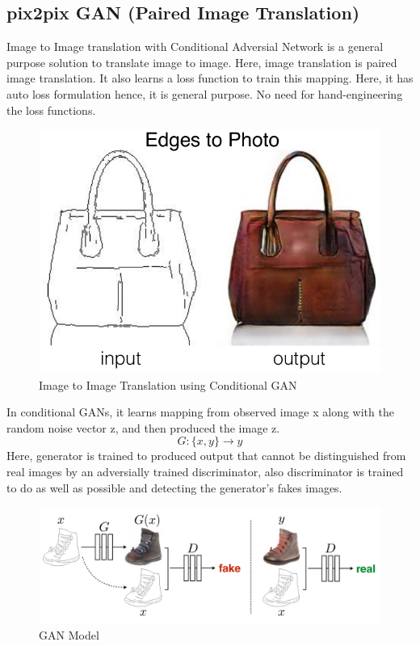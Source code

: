                 \subsection{pix2pix GAN (Paired Image Translation)}
                        Image to Image translation with Conditional Adversial Network is a general purpose solution to translate image to image. Here, image translation is paired image translation. It also learns a loss function to train this mapping. Here, it has auto loss formulation hence, it is general purpose. No need for hand-engineering the loss functions. \\
                        \begin{figure}[h]
                                \centering
                                \includegraphics[width=.5\textwidth]{img/chapter_6/GAN_example.png}
                                \caption{ Image to Image Translation using Conditional GAN}
                                \label{fig: Image to Image Translation using Conditional GAN}
                        \end{figure}
                        In conditional GANs, it learns mapping from observed image x along with the random noise vector z, and then produced the image z. 
                        \begin{equation}
                                G: \{x,y\} \rightarrow y
                        \end{equation}
                        Here, generator is trained to produced output that cannot be distinguished from real images by an adversially trained discriminator, also discriminator is trained to do as well as possible and detecting the generator's fakes images.\\
                        
                        \begin{figure}[h]
                                \centering
                                \includegraphics[width=.8\textwidth]{img/chapter_6/cGAN_model.png}
                                \caption{ GAN Model}
                                \label{fig: GAN Model}
                        \end{figure}

